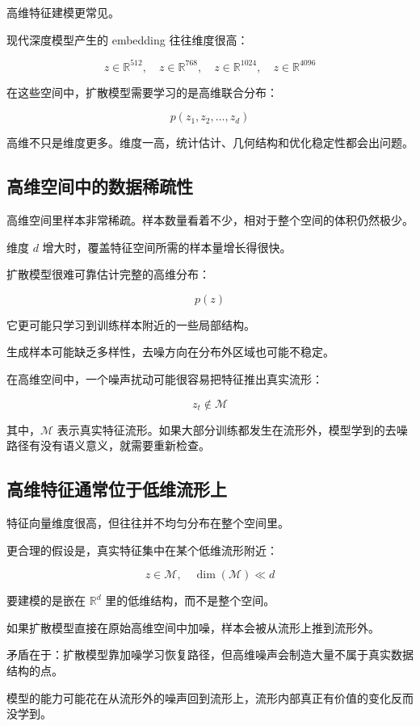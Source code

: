 高维特征建模更常见。

现代深度模型产生的 embedding 往往维度很高：

\[
z \in \mathbb{R}^{512},\quad
z \in \mathbb{R}^{768},\quad
z \in \mathbb{R}^{1024},\quad
z \in \mathbb{R}^{4096}
\]

在这些空间中，扩散模型需要学习的是高维联合分布：

\[
p(z_1,z_2,\dots,z_d)
\]

高维不只是维度更多。维度一高，统计估计、几何结构和优化稳定性都会出问题。

\subsection{高维空间中的数据稀疏性}

高维空间里样本非常稀疏。样本数量看着不少，相对于整个空间的体积仍然极少。

维度 \(d\) 增大时，覆盖特征空间所需的样本量增长得很快。

扩散模型很难可靠估计完整的高维分布：

\[
p(z)
\]

它更可能只学习到训练样本附近的一些局部结构。

生成样本可能缺乏多样性，去噪方向在分布外区域也可能不稳定。

在高维空间中，一个噪声扰动可能很容易把特征推出真实流形：

\[
z_t \notin \mathcal{M}
\]

其中，\(\mathcal{M}\) 表示真实特征流形。如果大部分训练都发生在流形外，模型学到的去噪路径有没有语义意义，就需要重新检查。

\subsection{高维特征通常位于低维流形上}

特征向量维度很高，但往往并不均匀分布在整个空间里。

更合理的假设是，真实特征集中在某个低维流形附近：

\[
z \in \mathcal{M}, \quad \dim(\mathcal{M}) \ll d
\]

要建模的是嵌在 \(\mathbb{R}^{d}\) 里的低维结构，而不是整个空间。

如果扩散模型直接在原始高维空间中加噪，样本会被从流形上推到流形外。

矛盾在于：扩散模型靠加噪学习恢复路径，但高维噪声会制造大量不属于真实数据结构的点。

模型的能力可能花在从流形外的噪声回到流形上，流形内部真正有价值的变化反而没学到。

